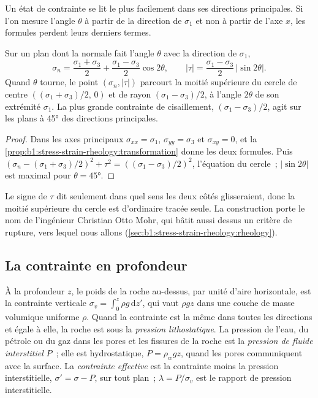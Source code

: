 Un état de contrainte se lit le plus facilement dans ses directions principales. Si l'on
mesure l'angle $\theta$ à partir de la direction de $\sigma_1$ et non à partir de
l'axe $x$, les formules perdent leurs derniers termes.

\begin{proposition}\label{prop:b1:stress-strain-rheology:mohr}
Sur un plan dont la normale fait l'angle $\theta$ avec la direction de
$\sigma_1$,
\[
  \sigma_n = \frac{\sigma_1+\sigma_3}{2} + \frac{\sigma_1-\sigma_3}{2}\cos2\theta,
  \qquad
  |\tau| = \frac{\sigma_1-\sigma_3}{2}\,|\sin2\theta| .
\]
Quand $\theta$ tourne, le point $(\sigma_n, |\tau|)$ parcourt la moitié supérieure du
cercle de centre $((\sigma_1+\sigma_3)/2,\, 0)$ et de rayon
$(\sigma_1-\sigma_3)/2$, à l'angle $2\theta$ de son extrémité $\sigma_1$. La
plus grande contrainte de cisaillement, $(\sigma_1-\sigma_3)/2$, agit sur les plans à
\ang{45} des directions principales.
\end{proposition}

\begin{proof}
Dans les axes principaux $\sigma_{xx} = \sigma_1$, $\sigma_{yy} = \sigma_3$ et
$\sigma_{xy} = 0$, et la \cref{prop:b1:stress-strain-rheology:transformation}
donne les deux formules. Puis
$(\sigma_n - (\sigma_1+\sigma_3)/2)^2 + \tau^2 = ((\sigma_1-\sigma_3)/2)^2$,
l'équation du cercle~; $|\sin2\theta|$ est maximal pour $\theta = \ang{45}$.
\end{proof}

Le signe de $\tau$ dit seulement dans quel sens les deux côtés glisseraient, donc la
moitié supérieure du cercle est d'ordinaire tracée seule. La construction porte le nom
de l'ingénieur Christian Otto Mohr, qui bâtit aussi dessus un critère de
rupture, vers lequel nous allons
(\cref{sec:b1:stress-strain-rheology:rheology}).

\subsection*{La contrainte en profondeur}

\begin{definition}\label{def:b1:stress-strain-rheology:lithostatic}
À la profondeur $z$, le poids de la roche au-dessus, par unité d'aire horizontale,
est la contrainte verticale $\sigma_v = \int_0^z\rho g\,\mathrm dz'$, qui vaut
$\rho g z$ dans une couche de masse volumique uniforme $\rho$. Quand la contrainte est la même
dans toutes les directions et égale à elle, la roche est sous la \emph{pression
lithostatique}. La pression de l'eau, du pétrole ou du gaz
dans les pores et les fissures de la roche est la \emph{pression de fluide
interstitiel} $P$~; elle est hydrostatique,
$P = \rho_w g z$, quand les pores communiquent avec la surface. La
\emph{contrainte effective} est la contrainte moins la pression
interstitielle, $\sigma' = \sigma - P$, sur tout plan~; $\lambda = P/\sigma_v$ est le
rapport de pression interstitielle.
\end{definition}

